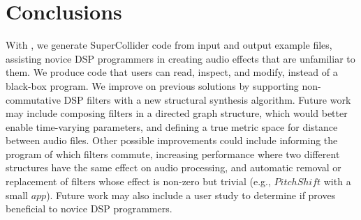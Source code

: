 \section{Conclusions}

With \ourTool, we generate SuperCollider code from input and output example files, assisting novice DSP programmers in creating audio effects that are unfamiliar to them.
We produce code that users can read, inspect, and modify, instead of a black-box program.
We improve on previous solutions by supporting non-commutative DSP filters with a new structural synthesis algorithm.
Future work may include composing filters in a directed graph structure, which would better enable time-varying parameters, and defining a true metric space for distance between audio files.
Other possible improvements could include informing the program of which filters commute, increasing performance where two different structures have the same effect on audio processing, and automatic removal or replacement of filters whose effect is non-zero but trivial (e.g., $PitchShift$ with a small $app$).
Future work may also include a user study to determine if \ourTool proves beneficial to novice DSP programmers.
